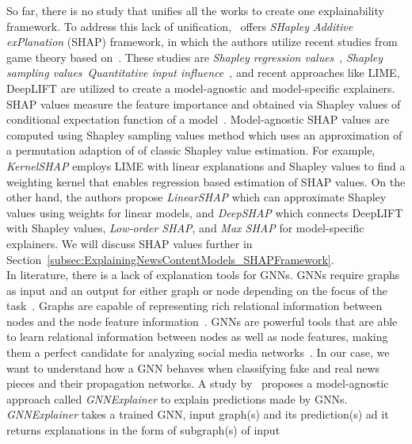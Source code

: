 So far, there is no study that unifies all the works to create one explainability framework. To address this lack of unification,~\cite{AUnifiedApproach_Lundberg} offers \emph{SHapley Additive exPlanation} (SHAP) framework, in which the authors utilize recent studies from game theory based on~\parencite{GameTheory_Shapley}. These studies are \emph{Shapley regression values}~\parencite{AnalysisOfRegressionInGameTheory_Lipovetsky}, \emph{Shapley sampling values}~\parencite{ExplainingPredictionModels_Strumbelj}\emph{Quantitative input influence}~\parencite{AlgorithmicTransparencyViaQuantitativeInputInfluence_Datta}, and recent approaches like LIME, DeepLIFT are utilized to create a model-agnostic and model-specific explainers. SHAP values measure the feature importance and obtained via Shapley values of conditional expectation function of a model~\parencite{AUnifiedApproach_Lundberg}. Model-agnostic SHAP values are computed using Shapley sampling values method which uses an approximation of a permutation adaption of of classic Shapley value estimation. For example, \emph{KernelSHAP} employs LIME with linear explanations and Shapley values to find a weighting kernel that enables regression based estimation of SHAP values. On the other hand, the authors propose \emph{LinearSHAP} which can approximate Shapley values using weights for linear models, and \emph{DeepSHAP} which connects DeepLIFT with Shapley values, \emph{Low-order SHAP}, and \emph{Max SHAP} for model-specific explainers. We will discuss SHAP values further in Section~\ref{subsec:ExplainingNewsContentModels_SHAPFramework}.\\
In literature, there is a lack of explanation tools for GNNs. GNNs require graphs as input and an output for either graph or node depending on the focus of the task~\parencite{DeepLearningOnGraphs_Zhang}. Graphs are capable of representing rich relational information between nodes and the node feature
information~\parencite{DeepLearningOnGraphs_Zhang, GNNsAReview_Zhou}. GNNs are powerful tools that are able to learn relational information between nodes as well as node features, making them a perfect candidate for analyzing social media networks~\parencite{BeyondSigmoids_Zang}. In our case, we want to understand how a GNN behaves when classifying fake and real news pieces and their propagation networks. A study by~\cite{GNNExplainer_Ying} proposes a model-agnostic approach called \emph{GNNExplainer} to explain predictions made by GNNs. \emph{GNNExplainer} takes a trained GNN, input graph(s) and its prediction(s) ad it returns explanations in the form of subgraph(s) of input

